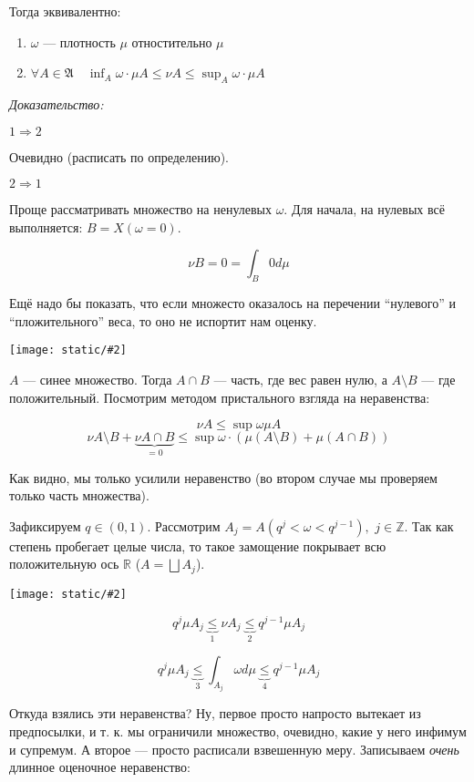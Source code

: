 \documentclass{article}
\def\dbl{\,\,}
\def\images#1#2{\begin{center}\texttt{[image: static/\#2]}\end{center}}
\begin{document}
Тогда эквивалентно:

\begin{enumerate}
    \item $\omega$ --- плотность $\mu$ отностительно $\mu$
    \item $\forall A \in \mathfrak{A} \quad \inf_{A} \omega \cdot \mu A \le \nu A \le \sup_{A} \omega \cdot \mu A$
\end{enumerate}

\textit{Доказательство:}

\textbf{$1 \Rightarrow 2$}

Очевидно (расписать по определению).

\textbf{$2 \Rightarrow 1$}

Проще рассматривать множество на ненулевых $\omega$. Для начала, на нулевых всё выполняется: $B = X(\omega = 0)$.

\[\nu B = 0 = \int_{B} 0 d\mu\]

Ещё надо бы показать, что если множесто оказалось на перечении ``нулевого'' и ``пложительного'' веса, то оно не испортит нам оценку. 

\images{0.5}{kr_pl_1.jpg}

$A$ --- синее множество. Тогда $A \cap B$ --- часть, где вес равен нулю, а $A \setminus B$ --- где положительный. Посмотрим методом пристального взгляда на неравенства:

\[\nu A \le \sup \omega \mu A\]
\[\nu A  \setminus B + \underbrace{\nu A \cap B}_{=0} \le \sup \omega \cdot ( \mu (A \setminus B) + \mu (A \cap B))\]

Как видно, мы только усилили неравенство (во втором случае мы проверяем только часть множества).

Зафиксируем $q \in (0, 1)$. Рассмотрим $A_j = A(q^j < \omega < q^{j - 1}), \dbl j \in \mathbb{Z}$. Так как степень пробегает целые числа, то такое замощение покрывает всю положительную ось $\mathbb{R}$ ($A = \bigsqcup A_j$).

\images{0.4}{kr_pl_2.jpg}

\[q^j \mu A_j \underbrace{\le}_{1} \nu A_j \underbrace{\le}_{2} q^{j - 1} \mu A_j\]

\[q^j \mu A_j \underbrace{\le}_{3} \int_{A_j} \omega d\mu \underbrace{\le}_{4} q^{j - 1} \mu A_j\]

Откуда взялись эти неравенства? Ну, первое просто напросто вытекает из предпосылки, и т. к. мы ограничили множество, очевидно, какие у него инфимум и супремум. А второе --- просто расписали взвешенную меру. Записываем \textit{очень} длинное оценочное неравенство:
\end{document}

